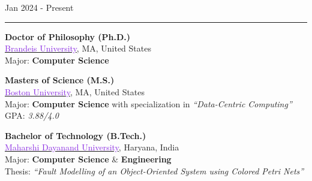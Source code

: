 \begin{minipage}[c]{0.20\textwidth}
	\hfill
	Jan 2024 \-- Present
\end{minipage}%
\hspace{0.01\textwidth}
\begin{minipage}[c]{0.02\textwidth}
	\textcolor{lightgray}{\rule{1pt}{1.2cm}}
\end{minipage}%
\begin{minipage}[c]{0.76\textwidth}
	\raggedright{
		\textbf{Doctor of Philosophy (Ph.D.)}\\
		\href{https://www.brandeis.edu/}{\textcolor{blueviolet}{Brandeis University}}, MA, United States\\
		Major: \textbf{Computer Science}\\
	}
\end{minipage}%

\mediumspace{}

{
	\textbf{Masters of Science (M.S.)}\\
	\href{https://www.bu.edu/}{\textcolor{blueviolet}{Boston University}}, MA, United States\\
	Major: \textbf{Computer Science} with specialization in \textit{“Data-Centric Computing''}\\
	GPA: \textit{3.88/4.0}
}

\mediumspace{}

{
	\textbf{Bachelor of Technology (B.Tech.)}\\
	\href{https://mdu.ac.in/}{\textcolor{blueviolet}{Maharshi Dayanand University}}, Haryana, India\\
	Major: \textbf{Computer Science} \& \textbf{Engineering}\\
	Thesis: \textit{“Fault Modelling of an Object-Oriented System using Colored Petri Nets''}\\
}